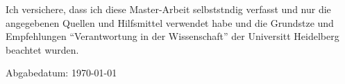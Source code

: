 \documentclass[
     12pt,         %
     a4paper,      %
     BCOR10mm,     %
     DIV14,        %
     ]{scrreprt}
\begin{document}
\noindent
Ich versichere, dass ich diese Master-Arbeit selbststndig verfasst und nur die angegebenen
Quellen und Hilfsmittel verwendet habe und die Grundstze und
Empfehlungen ``Verantwortung in der Wissenschaft'' der Universitt Heidelberg beachtet wurden. 

\vspace*{50pt}
\noindent

\underline{\phantom{mmmmmmmmmmmmmmmmmmmm}}

\medskip
\noindent 
Abgabedatum: \today
\end{document}
